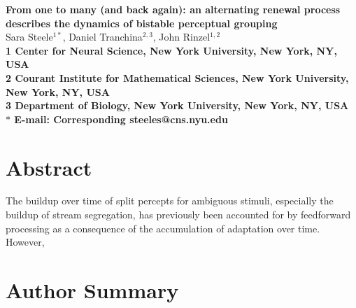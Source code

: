 \documentclass[10pt]{article}
\date{}
\begin{document}
\begin{flushleft}
{\Large
\textbf{From one to many (and back again): an alternating renewal process describes the dynamics of bistable perceptual grouping}
}
\\
Sara Steele$^{1\ast}$, 
Daniel Tranchina$^{2,3}$, 
John Rinzel$^{1,2}$
\\
\bf{1} Center for Neural Science, New York University, New York, NY, USA
\\
\bf{2} Courant Institute for Mathematical Sciences, New York University, New York, NY, USA
\\
\bf{3} Department of Biology, New York University, New York, NY, USA
\\
$\ast$ E-mail: Corresponding steeles@cns.nyu.edu
\end{flushleft}

\section*{Abstract}
The buildup over time of split percepts for ambiguous stimuli, especially the buildup of stream segregation, has previously been accounted for by feedforward processing as a consequence of the accumulation of adaptation over time. However, 

\section*{Author Summary}
\end{document}
